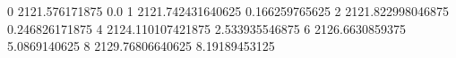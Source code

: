 0 2121.576171875 0.0
1 2121.742431640625 0.166259765625
2 2121.822998046875 0.246826171875
4 2124.110107421875 2.533935546875
6 2126.6630859375 5.0869140625
8 2129.76806640625 8.19189453125

